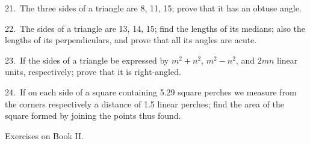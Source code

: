 \documentclass[oneside]{book}
\newcommand\exhead[1]{
\Needspace*{5\baselineskip}\begin{center}
\textsf{#1}
\end{center}
}
\begin{document}
\begin{footnotesize}
21.~The three sides of a triangle are 8, 11, 15; prove that it
has an obtuse angle.

22.~The sides of a triangle are 13, 14, 15; find the lengths of
its medians; also the lengths of its perpendiculars, and prove
that all its angles are acute.

23.~If the sides of a triangle be expressed by $m^2 + n^2$, $m^2 - n^2$,
and $2mn$ linear units, respectively; prove that it is right-angled.

24.~If on each side of a square containing 5.29 square perches
we measure from the corners respectively a distance of 1.5 linear
perches; find the area of the square formed by joining the points
thus found.
\par\end{footnotesize}

\exhead{Exercises on Book II\@.}
\end{document}
